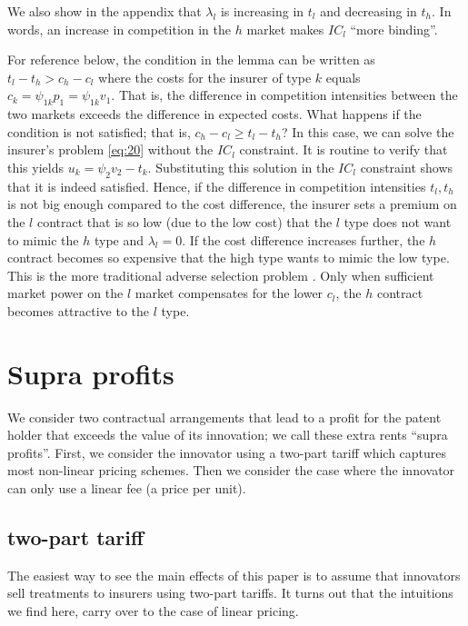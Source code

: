 \documentclass[a4paper,12pt]{article}
\begin{document}
We also show in the appendix that \(\lambda_l\) is increasing in \(t_l\) and decreasing in \(t_h\). In words, an increase in competition in the \(h\) market makes \(IC_l\) ``more binding''.

For reference below, the condition in the lemma can be written as \(t_l-t_h>c_h-c_l\) where the costs for the insurer of type \(k\) equals \(c_k = \psi_{1k} p_1= \psi_{1k}v_1\). That is, the difference in competition intensities between the two markets exceeds the difference in expected costs. What happens if the condition is not satisfied; that is, \(c_h -c_l \geq t_l-t_h\)? In this case, we can solve the insurer's problem \eqref{eq:20} without the \(IC_l\) constraint. It is routine to verify that this yields \(u_k = \psi_2 v_2-t_k\). Substituting this solution in the \(IC_l\) constraint shows that it is indeed satisfied. Hence, if the difference in competition intensities \(t_l,t_h\) is not big enough compared to the cost difference, the insurer sets a premium on the \(l\) contract that is so low (due to the low cost) that the \(l\) type does not want to mimic the \(h\) type and \(\lambda_l=0\). If the cost difference increases further, the \(h\) contract becomes so expensive that the high type wants to mimic the low type. This is the more traditional adverse selection problem \citep{rot76}. Only when sufficient market power on the \(l\) market compensates for the lower \(c_l\), the \(h\) contract becomes attractive to the \(l\) type.


\section{Supra profits}
\label{sec:org417188a}

We consider two contractual arrangements that lead to a profit for the patent holder that exceeds the value of its innovation; we call these extra rents ``supra profits''. First, we consider the innovator using a two-part tariff which captures most non-linear pricing schemes. Then we consider the case where the innovator can only use a linear fee (a price per unit).

\subsection{two-part tariff}
\label{sec:orgd01da52}

The easiest way to see the main effects of this paper is to assume that innovators sell treatments to insurers using two-part tariffs. It turns out that the intuitions we find here, carry over to the case of linear pricing.
\end{document}
